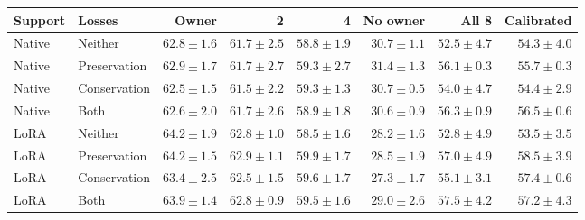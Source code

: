 \begin{tabular}{@{}llrrrrrr@{}}
\toprule
Support & Losses & Owner & 2 & 4 & No owner & All 8 & Calibrated\\
\midrule
Native & Neither & $62.8 \pm 1.6$ & $61.7 \pm 2.5$ & $58.8 \pm 1.9$ & $30.7 \pm 1.1$ & $52.5 \pm 4.7$ & $54.3 \pm 4.0$\\
Native & Preservation & $62.9 \pm 1.7$ & $61.7 \pm 2.7$ & $59.3 \pm 2.7$ & $31.4 \pm 1.3$ & $56.1 \pm 0.3$ & $55.7 \pm 0.3$\\
Native & Conservation & $62.5 \pm 1.5$ & $61.5 \pm 2.2$ & $59.3 \pm 1.3$ & $30.7 \pm 0.5$ & $54.0 \pm 4.7$ & $54.4 \pm 2.9$\\
Native & Both & $62.6 \pm 2.0$ & $61.7 \pm 2.6$ & $58.9 \pm 1.8$ & $30.6 \pm 0.9$ & $56.3 \pm 0.9$ & $56.5 \pm 0.6$\\
LoRA & Neither & $64.2 \pm 1.9$ & $62.8 \pm 1.0$ & $58.5 \pm 1.6$ & $28.2 \pm 1.6$ & $52.8 \pm 4.9$ & $53.5 \pm 3.5$\\
LoRA & Preservation & $64.2 \pm 1.5$ & $62.9 \pm 1.1$ & $59.9 \pm 1.7$ & $28.5 \pm 1.9$ & $57.0 \pm 4.9$ & $58.5 \pm 3.9$\\
LoRA & Conservation & $63.4 \pm 2.5$ & $62.5 \pm 1.5$ & $59.6 \pm 1.7$ & $27.3 \pm 1.7$ & $55.1 \pm 3.1$ & $57.4 \pm 0.6$\\
LoRA & Both & $63.9 \pm 1.4$ & $62.8 \pm 0.9$ & $59.5 \pm 1.6$ & $29.0 \pm 2.6$ & $57.5 \pm 4.2$ & $57.2 \pm 4.3$\\
\bottomrule
\end{tabular}
